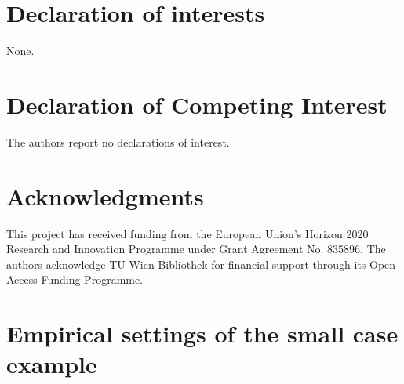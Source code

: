 \documentclass[review]{elsarticle}
\begin{document}






\section*{Declaration of interests}
None.
\section*{Declaration of Competing Interest}
The authors report no declarations of interest.
\section*{Acknowledgments}
This project has received funding from the European Union's Horizon 2020 Research and Innovation Programme under Grant Agreement No. 835896. The authors acknowledge TU Wien Bibliothek for financial support through its Open Access Funding Programme.


\appendix
\setcounter{table}{0}
\setcounter{figure}{0}


\section{Empirical settings of the small case example}\label{app:verify}
\begin{table}[h]
	\centering
	\caption{Data assumptions of the small case example}
	\label{tab:a2}
\end{table}
\end{document}
